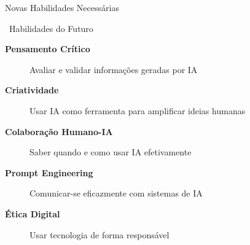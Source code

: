\documentclass[aspectratio=169,12pt]{beamer}
\begin{document}
\begin{frame}{Novas Habilidades Necessárias}
    \begin{block}{\faBrain\, Habilidades do Futuro}
        \begin{description}
            \item[\textcolor{accent}{\faBrain} \textbf{Pensamento Crítico}] 
                Avaliar e validar informações geradas por IA
                
            \item[\textcolor{secondary}{\faLightbulb} \textbf{Criatividade}] 
                Usar IA como ferramenta para amplificar ideias humanas
                
            \item[\textcolor{success}{\faHandshake} \textbf{Colaboração Humano-IA}] 
                Saber quando e como usar IA efetivamente
                
            \item[\textcolor{warning}{\faComments} \textbf{Prompt Engineering}] 
                Comunicar-se eficazmente com sistemas de IA
                
            \item[\textcolor{danger}{\faBalanceScale} \textbf{Ética Digital}] 
                Usar tecnologia de forma responsável
        \end{description}
    \end{block}
\end{frame}
\end{document}
